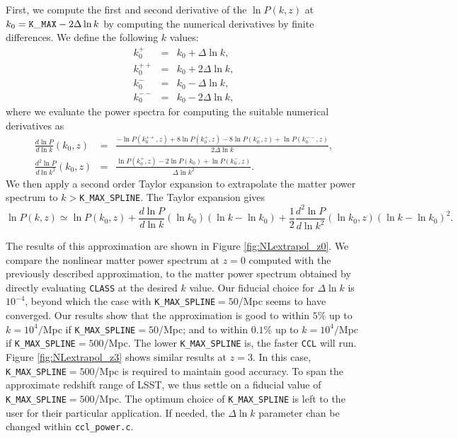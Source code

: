 \documentclass[\docopts]{\docclass}
\begin{document}
First, we compute the first and second derivative of the $\ln P(k,z)$ at $k_0={\rm \tt K\_MAX}-2\Delta\ln k$ by computing the numerical derivatives by finite differences. We define the following $k$ values:
%
\begin{eqnarray}
k_0^{+}&=&k_0+\Delta\ln k,\\
k_0^{++}&=&k_0+2\Delta\ln k,\\
k_0^{-}&=&k_0-\Delta\ln k,\\
k_0^{--}&=&k_0-2\Delta\ln k,
\end{eqnarray}
%
where we evaluate the power spectra for computing the suitable numerical derivatives as
%
\begin{eqnarray}
  \frac{d\ln P}{d\ln k}(k_0,z)&=& \frac{-\ln P(k_0^{++},z)+8\ln P(k_0^{+},z)-8\ln P(k_0^{-},z)+\ln P(k_0^{--},z)}{2\Delta \ln k},\\
  \frac{d^2\ln P}{d\ln k^2}(k_0,z)&=& \frac{\ln P(k_0^{+},z)-2\ln P(k_0)+\ln P(k_0^{-},z)}{\Delta\ln k^2}.
  \label{eq:numderiv_dlnP}
\end{eqnarray}
%
We then apply a second order Taylor expansion to extrapolate the matter power spectrum to $k>${\tt K\_MAX\_SPLINE}. The Taylor expansion gives
%
\begin{equation}
  \ln P(k,z) \simeq \ln P(k_0,z) + \frac{d\ln P}{d\ln k}(\ln k_0) (\ln k-\ln k_0)  + \frac{1}{2}  \frac{d^2\ln P}{d\ln k^2}(\ln k_0,z) (\ln k-\ln k_0)^2.
  \label{eq:NLPSTaylor}
\end{equation}

The results of this approximation are shown in Figure \ref{fig:NLextrapol_z0}. We compare the nonlinear matter power spectrum at $z=0$ computed with the previously described approximation, to the matter power spectrum obtained by directly evaluating {\tt CLASS} at the desired $k$ value. Our fiducial choice for $\Delta \ln k$ is $10^{-4}$, beyond which the case with {\tt K\_MAX\_SPLINE}$=50$/Mpc seems to have converged. Our results show that the approximation is good to within $5\%$ up to $k=10^4/$Mpc if {\tt K\_MAX\_SPLINE}$=50$/Mpc; and to within $0.1\%$ up to $k=10^4/$Mpc if {\tt K\_MAX\_SPLINE}$=500$/Mpc. The lower {\tt K\_MAX\_SPLINE} is, the faster {\tt CCL} will run. Figure \ref{fig:NLextrapol_z3} shows similar results at $z=3$. In this case, {\tt K\_MAX\_SPLINE}$=500$/Mpc is required to maintain good accuracy. To span the approximate redshift range of LSST, we thus settle on a fiducial value of {\tt K\_MAX\_SPLINE}$=500$/Mpc. The optimum choice of {\tt K\_MAX\_SPLINE} is left to the user for their particular application. If needed, the $\Delta\ln k$ parameter chan be changed within {\tt ccl\_power.c}.
\end{document}
